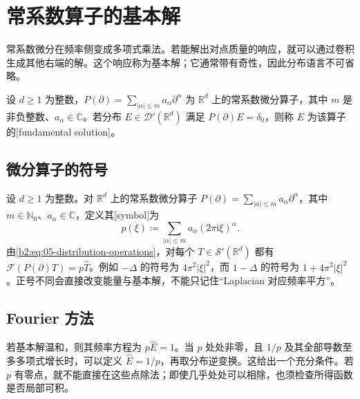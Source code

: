 \section{常系数算子的基本解}
\label{b2:sec:0504}

常系数微分在频率侧变成多项式乘法。若能解出对点质量的响应，就可以通过卷积生成其他右端的解。这个响应称为基本解；它通常带有奇性，因此分布语言不可省略。

\begin{definition}\label{b2:def:05-fundamental}
设 \(d\geq1\) 为整数，\(P(\partial)=\sum_{|\alpha|\leq m}a_\alpha\partial^\alpha\) 为 \(\mathbb R^d\) 上的常系数微分算子，其中 \(m\) 是非负整数、\(a_\alpha\in\mathbb C\)。若分布 \(E\in\mathcal D'(\mathbb R^d)\) 满足 \(P(\partial)E=\delta_0\)，则称 \(E\) 为该算子的[fundamental solution]。
\end{definition}

\subsection{微分算子的符号}
\label{b2:subsec:050401}

设 \(d\geq1\) 为整数。对 \(\mathbb R^d\) 上的常系数微分算子 \(P(\partial)=\sum_{|\alpha|\le m}a_\alpha\partial^\alpha\)，其中 \(m\in\mathbb N_0\)、\(a_\alpha\in\mathbb C\)，定义其[symbol]为
\[
 p(\xi)\coloneqq\sum_{|\alpha|\leq m}a_\alpha(2\pi\mathrm{i}\xi)^\alpha.
\]
由\eqref{b2:eq:05-distribution-operations}，对每个 \(T\in\mathcal S'(\mathbb R^d)\) 都有 \(\mathcal F(P(\partial)T)=p\widehat T\)。例如 \(-\Delta\) 的符号为 \(4\pi^2|\xi|^2\)，而 \(1-\Delta\) 的符号为 \(1+4\pi^2|\xi|^2\)。正号不同会直接改变能量与基本解，不能只记住“Laplacian 对应频率平方”。

\subsection{Fourier 方法}
\label{b2:subsec:050402}

若基本解温和，则其频率方程为 \(p\widehat E=1\)。当 \(p\) 处处非零，且 \(1/p\) 及其全部导数至多多项式增长时，可以定义 \(\widehat E=1/p\)，再取分布逆变换。这给出一个充分条件。若 \(p\) 有零点，就不能直接在这些点除法；即使几乎处处可以相除，也须检查所得函数是否局部可积。

